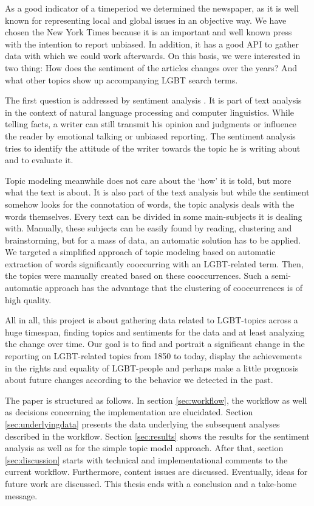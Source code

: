 \documentclass[10pt,a4paper,twocolumn]{scrartcl}
\begin{document}
As a good indicator of a timeperiod we determined the newspaper, as it is well known for representing local and global issues in an objective way. We have chosen the New York Times because it is an important and well known press with the intention to report unbiased. In addition, it has a good API to gather data with which we could work afterwards. On this basis, we were interested in two thing: How does the sentiment of the articles changes over the years? And what other topics show up accompanying LGBT search terms.

The first question is addressed by sentiment analysis \citep{Nasukawa+Yi:2003, Godbole+al:2007, Cambria+al:2013}. It is part of text analysis in the context of natural language processing and computer linguistics. While telling facts, a writer can still transmit his opinion and judgments or influence the reader by emotional talking or unbiased reporting. The sentiment analysis tries to identify the attitude of the writer towards the topic he is writing about and to evaluate it.

Topic modeling \citep{Wallach:2006, Blei:2012} meanwhile does not care about the `how' it is told, but more what the text is about. It is also part of the text analysis but while the sentiment somehow looks for the connotation of words, the topic analysis deals with the words themselves. Every text can be divided in some main-subjects it is dealing with. Manually, these subjects can be easily found by reading, clustering and brainstorming, but for a mass of data, an automatic solution has to be applied. We targeted a simplified approach of topic modeling based on automatic extraction of words significantly cooccurring with an LGBT-related term. Then, the topics were manually created based on these cooccurrences. Such a semi-automatic approach has the advantage that the clustering of cooccurrences is of high quality.

All in all, this project is about gathering data related to LGBT-topics across a huge timespan, finding topics and sentiments for the data and at least analyzing the change over time. Our goal is to find and portrait a significant change in the reporting on LGBT-related topics from 1850 to today, display the achievements in the rights and equality of LGBT-people and perhaps make a little prognosis about future changes according to the behavior we detected in the past.

The paper is structured as follows. In section \ref{sec:workflow}, the workflow as well as decisions concerning the implementation are elucidated. Section \ref{sec:underlyingdata} presents the data underlying the subsequent analyses described in the workflow. Section \ref{sec:results} shows the results for the sentiment analysis as well as for the simple topic model approach. After that, section \ref{sec:discussion} starts with technical and implementational comments to the current workflow. Furthermore, content issues are discussed. Eventually, ideas for future work are discussed. This thesis ends with a conclusion and a take-home message.
\end{document}
